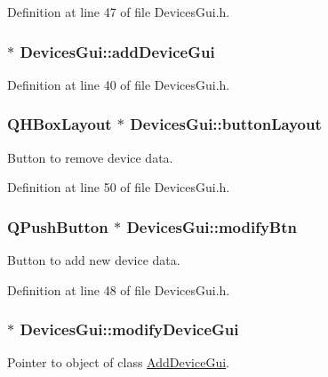 Definition at line 47 of file Devices\-Gui.\-h.

\hypertarget{class_devices_gui_aeebea560adf26f2fbd85bfe0a7a3d4bb}{
\subsubsection[{add\-Device\-Gui}]{ $\ast$ Devices\-Gui\-::add\-Device\-Gui\hspace{0.3cm}{\ttfamily [private]}}}\label{class_devices_gui_aeebea560adf26f2fbd85bfe0a7a3d4bb}


Definition at line 40 of file Devices\-Gui.\-h.

\hypertarget{class_devices_gui_a36b9c0d9fbce9b50b1def57dd6185e23}{
\subsubsection[{button\-Layout}]{\setlength{\rightskip}{0pt plus 5cm}Q\-H\-Box\-Layout $\ast$ Devices\-Gui\-::button\-Layout\hspace{0.3cm}{\ttfamily [private]}}}\label{class_devices_gui_a36b9c0d9fbce9b50b1def57dd6185e23}
Button to remove device data. 

Definition at line 50 of file Devices\-Gui.\-h.

\hypertarget{class_devices_gui_a60afa6184b9acba46a0c61660cf17018}{
\subsubsection[{modify\-Btn}]{\setlength{\rightskip}{0pt plus 5cm}Q\-Push\-Button $\ast$ Devices\-Gui\-::modify\-Btn\hspace{0.3cm}{\ttfamily [private]}}}\label{class_devices_gui_a60afa6184b9acba46a0c61660cf17018}
Button to add new device data. 

Definition at line 48 of file Devices\-Gui.\-h.

\hypertarget{class_devices_gui_a7f6a808cd74775c594f0fe6e313d8eaa}{
\subsubsection[{modify\-Device\-Gui}]{ $\ast$ Devices\-Gui\-::modify\-Device\-Gui\hspace{0.3cm}{\ttfamily [private]}}}\label{class_devices_gui_a7f6a808cd74775c594f0fe6e313d8eaa}
Pointer to object of class \hyperlink{class_add_device_gui}{Add\-Device\-Gui}. 

